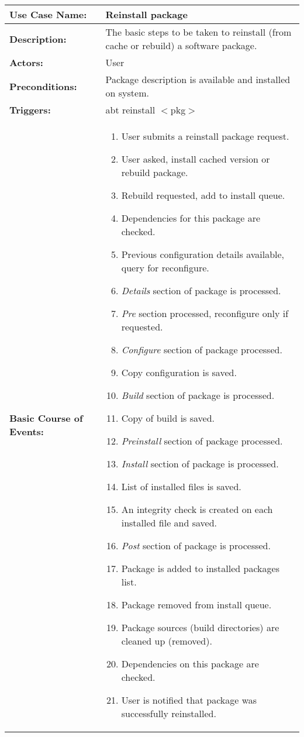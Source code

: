 \begin{tabularx}{\linewidth}{|l|X|}
\hline
\textbf{Use Case Name:} & \textbf{Reinstall package} \\
\hline
\textbf{Description:} & 
The basic steps to be taken to reinstall (from cache or rebuild) a software package.\\
\hline
\textbf{Actors:} & User \\
\hline
\textbf{Preconditions:} & Package description is available and installed on system. \\
\hline
\textbf{Triggers:} & abt reinstall $<$pkg$>$ \\
\hline
\textbf{Basic Course of Events:} & 
\begin{minipage}{\linewidth} 
  \vspace{0.02em}
  \begin{enumerate}
    \item User submits a reinstall package request.
    \item User asked, install cached version or rebuild package.
    \item Rebuild requested, add to install queue.
    \item Dependencies for this package are checked.
    \item Previous configuration details available, query for reconfigure.
    \item \emph{Details} section of package is processed.
    \item \emph{Pre} section processed, reconfigure only if requested.
    \item \emph{Configure} section of package processed.
    \item Copy configuration is saved.
    \item \emph{Build} section of package is processed.
    \item Copy of build is saved.
    \item \emph{Preinstall} section of package processed.
    \item \emph{Install} section of package is processed.
    \item List of installed files is saved.
    \item An integrity check is created on each installed file and saved.
    \item \emph{Post} section of package is processed.
    \item Package is added to installed packages list.
    \item Package removed from install queue.
    \item Package sources (build directories) are cleaned up (removed).
    \item Dependencies on this package are checked.
    \item User is notified that package was successfully reinstalled.
  \end{enumerate}
  \vspace{0.02em}
\end{minipage}
\\
\hline
\end{tabularx}

